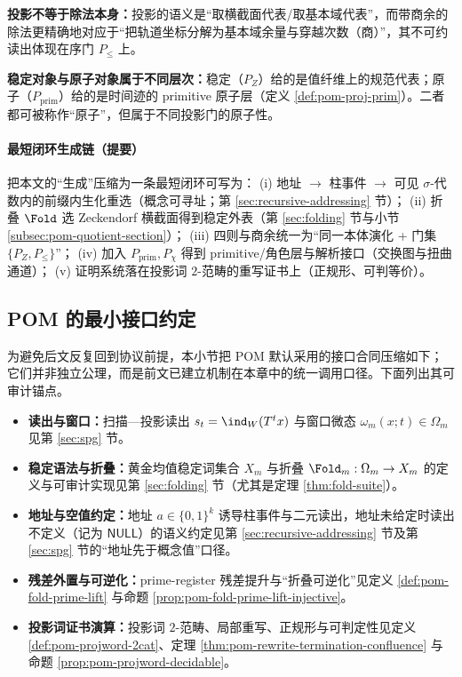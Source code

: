 \begin{remark}[澄清：投影 \texorpdfstring{$\neq$}{!=} 除法；稳定 \texorpdfstring{$\neq$}{!=} 素数]\label{rem:pom-projection-vs-division}
\textbf{投影不等于除法本身：}投影的语义是“取横截面代表/取基本域代表”，而带商余的除法更精确地对应于“把轨道坐标分解为基本域余量与穿越次数（商）”，其不可约读出体现在序门 \(P_{\le}\) 上。
\par
\textbf{稳定对象与原子对象属于不同层次：}稳定（\(P_Z\)）给的是值纤维上的规范代表；原子（\(P_{\mathrm{prim}}\)）给的是时间迹的 primitive 原子层（定义 \ref{def:pom-proj-prim}）。二者都可被称作“原子”，但属于不同投影门的原子性。
\end{remark}

\paragraph{最短闭环生成链（提要）}
把本文的“生成”压缩为一条最短闭环可写为：
(i) 地址 \(\to\) 柱事件 \(\to\) 可见 \(\sigma\)-代数内的前缀内生化重选（概念可寻址；第 \ref{sec:recursive-addressing} 节）；
(ii) 折叠 \(\Fold\) 选 Zeckendorf 横截面得到稳定外表（第 \ref{sec:folding} 节与小节 \ref{subsec:pom-quotient-section}）；
(iii) 四则与商余统一为“同一本体演化 + 门集 \(\{P_Z,P_{\le}\}\)”；
(iv) 加入 \(P_{\mathrm{prim}},P_\chi\) 得到 primitive/角色层与解析接口（交换图与扭曲通道）；
(v) 证明系统落在投影词 \(2\)-范畴的重写证书上（正规形、可判等价）。



\subsection{POM 的最小接口约定}\label{subsec:pom-min}
为避免后文反复回到协议前提，本小节把 POM 默认采用的接口合同压缩如下；它们并非独立公理，而是前文已建立机制在本章中的统一调用口径。下面列出其可审计锚点。
\begin{itemize}
  \item \textbf{读出与窗口：}扫描—投影读出 \(s_t=\ind_W(T^t x)\) 与窗口微态 \(\omega_m(x;t)\in\Omega_m\) 见第 \ref{sec:spg} 节。
  \item \textbf{稳定语法与折叠：}黄金均值稳定词集合 \(X_m\) 与折叠 \(\Fold_m:\Omega_m\to X_m\) 的定义与可审计实现见第 \ref{sec:folding} 节（尤其是定理 \ref{thm:fold-suite}）。
  \item \textbf{地址与空值约定：}地址 \(a\in\{0,1\}^k\) 诱导柱事件与二元读出，地址未给定时读出不定义（记为 \(\mathsf{NULL}\)）的语义约定见第 \ref{sec:recursive-addressing} 节及第 \ref{sec:spg} 节的“地址先于概念值”口径。
  \item \textbf{残差外置与可逆化：}prime-register 残差提升与“折叠可逆化”见定义 \ref{def:pom-fold-prime-lift} 与命题 \ref{prop:pom-fold-prime-lift-injective}。
  \item \textbf{投影词证书演算：}投影词 \(2\)-范畴、局部重写、正规形与可判定性见定义 \ref{def:pom-projword-2cat}、定理 \ref{thm:pom-rewrite-termination-confluence} 与命题 \ref{prop:pom-projword-decidable}。
\end{itemize}

